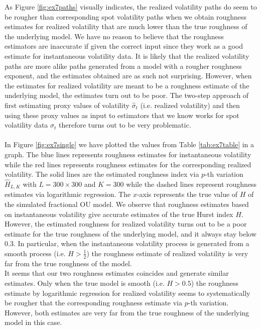 \documentclass{article}
\begin{document}
As Figure \ref{fig:ex7paths} visually indicates, the realized volatility paths do seem to be rougher than corresponding spot volatility paths when we obtain roughness estimates for realized volatility that are much lower than the true roughness of the underlying model. We have no reason to believe that the roughness estimators are inaccurate if given the correct input since they work as a good estimate for instantaneous volatility data. It is likely that the realized volatility paths are more alike paths generated from a model with a rougher roughness exponent, and the estimates obtained are as such not surprising. However, when the estimates for realized volatility are meant to be a roughness estimate of the underlying model, the estimates turn out to be poor. The two-step approach of first estimating proxy values of volatility $\hat{\sigma}_t$ (i.e. realized volatility) and then using these proxy values as input to estimators that we know works for spot volatility data $\sigma_t$ therefore turns out to be very problematic. \\\\
In Figure \ref{fig:ex7single} we have plotted the values from Table \ref{tab:ex7table} in a graph. The blue lines represents roughness estimates for instantaneous volatility while the red lines represents roughness estimates for the corresponding realized volatility. The solid lines are the estimated roughness index via $p$-th variation $\hat{H}_{L,K}$ with $L=300\times 300$ and $K=300$ while the dashed lines represent roughness estimates via logarithmic regression. The $x$-axis represents the true value of $H$ of the simulated fractional OU model. We observe that roughness estimates based on instantaneous volatility give accurate estimates of the true Hurst index $H$. However, the estimated roughness for realized volatility turns out to be a poor estimate for the true roughness of the underlying model, and it always stay below $0.3$. In particular, when the instantaneous volatility process is generated from a smooth process (i.e. $H>\frac{1}{2}$) the roughness estimate of realized volatility is very far from the true roughness of the model.\\ 
It seems that our two roughness estimates coincides and generate similar estimates. Only when the true model is smooth (i.e. $H>0.5$) the roughness estimate by logarithmic regression for realized volatility seems to systematically be rougher that the corresponding roughness estimate via $p$-th variation. However, both estimates are very far from the true roughness of the underlying model in this case. 
\end{document}
